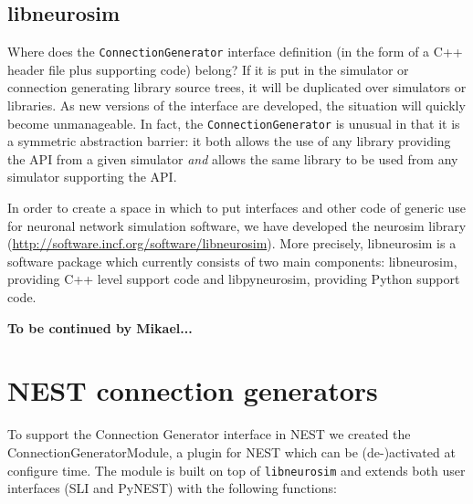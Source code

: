 \documentclass{frontiersSCNS} %
\newcommand{\tbw}[1]{{\bf\parindent0pt\color{red}#1}}
\begin{document}
\subsection{libneurosim}
Where does the \verb|ConnectionGenerator| interface definition (in the
form of a C++ header file plus supporting code) belong?  If it is put
in the simulator or connection generating library source trees, it
will be duplicated over simulators or libraries.  As new versions of
the interface are developed, the situation will quickly become
unmanageable.  In fact, the \verb|ConnectionGenerator| is unusual in
that it is a symmetric abstraction barrier: it both allows the use of
any library providing the API from a given simulator \emph{and} allows
the same library to be used from any simulator supporting the API.

In order to create a space in which to put interfaces and other code of
generic use for neuronal network simulation software, we have
developed the neurosim library
(\url{http://software.incf.org/software/libneurosim}).  More
precisely, libneurosim is a software package which currently consists
of two main components: libneurosim, providing C++ level support code
and libpyneurosim, providing Python support code.

\tbw{To be continued by Mikael...}

\section{NEST connection generators}\label{sec:conn_gen_nest}

%

To support the Connection Generator interface in NEST
we created the ConnectionGeneratorModule, a plugin for NEST which can
be (de-)activated at configure time. The module is built on top of
\verb|libneurosim| and extends both user interfaces (SLI and PyNEST)
with the following functions:
\end{document}
